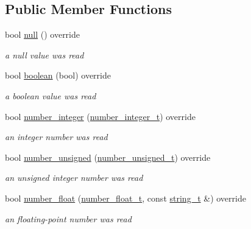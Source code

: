 \subsection*{Public Member Functions}
\begin{DoxyCompactItemize}
\item 
bool \hyperlink{classnlohmann_1_1detail_1_1json__sax__acceptor_a173c310b2f829b2c49645af8336c27b8}{null} () override
\begin{DoxyCompactList}\small\item\em a null value was read \end{DoxyCompactList}\item 
bool \hyperlink{classnlohmann_1_1detail_1_1json__sax__acceptor_ac629bf4f75f489f101d9cd08ffb21d90}{boolean} (bool) override
\begin{DoxyCompactList}\small\item\em a boolean value was read \end{DoxyCompactList}\item 
bool \hyperlink{classnlohmann_1_1detail_1_1json__sax__acceptor_ab74d476d1540851afc690aff28301cac}{number\+\_\+integer} (\hyperlink{structnlohmann_1_1json__sax_a0cef30121f02b7fee85e9708148ea0aa}{number\+\_\+integer\+\_\+t}) override
\begin{DoxyCompactList}\small\item\em an integer number was read \end{DoxyCompactList}\item 
bool \hyperlink{classnlohmann_1_1detail_1_1json__sax__acceptor_a0759eb1ea812c4cfdf42065dd7f4c71b}{number\+\_\+unsigned} (\hyperlink{structnlohmann_1_1json__sax_a32028cc056ae0f43aaae331cdbbbf856}{number\+\_\+unsigned\+\_\+t}) override
\begin{DoxyCompactList}\small\item\em an unsigned integer number was read \end{DoxyCompactList}\item 
bool \hyperlink{classnlohmann_1_1detail_1_1json__sax__acceptor_a60cf2aa6ba77110a9290e9fc0b5e5873}{number\+\_\+float} (\hyperlink{structnlohmann_1_1json__sax_a390c209bffd8c4800c8f3076dc465a20}{number\+\_\+float\+\_\+t}, const \hyperlink{structnlohmann_1_1json__sax_ae01977a9f3c5b3667b7a2929ed91061e}{string\+\_\+t} \&) override
\begin{DoxyCompactList}\small\item\em an floating-\/point number was read \end{DoxyCompactList}\item 

\end{DoxyCompactItemize}
